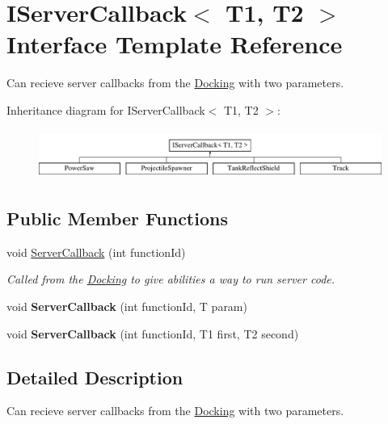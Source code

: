 \hypertarget{interface_i_server_callback}{}\section{I\+Server\+Callback$<$ T1, T2 $>$ Interface Template Reference}
\label{interface_i_server_callback}


Can recieve server callbacks from the \hyperlink{class_docking}{Docking} with two parameters.  


Inheritance diagram for I\+Server\+Callback$<$ T1, T2 $>$\+:\begin{figure}[H]
\begin{center}
\leavevmode
\includegraphics[height=1.627907cm]{interface_i_server_callback}
\end{center}
\end{figure}
\subsection*{Public Member Functions}
\begin{DoxyCompactItemize}
\item 
void \hyperlink{interface_i_server_callback_a2fb5354c07d38473e81ba374bad19446}{Server\+Callback} (int function\+Id)
\begin{DoxyCompactList}\small\item\em Called from the \hyperlink{class_docking}{Docking} to give abilities a way to run server code. \end{DoxyCompactList}\item 
\hypertarget{interface_i_server_callback_a5cc582711ec6f1d97344d3242c8c2a5c}{}\label{interface_i_server_callback_a5cc582711ec6f1d97344d3242c8c2a5c} 
void {\bfseries Server\+Callback} (int function\+Id, T param)
\item 
\hypertarget{interface_i_server_callback_aea86d731a9f2326398b5e3df36ae3c3f}{}\label{interface_i_server_callback_aea86d731a9f2326398b5e3df36ae3c3f} 
void {\bfseries Server\+Callback} (int function\+Id, T1 first, T2 second)
\end{DoxyCompactItemize}


\subsection{Detailed Description}
Can recieve server callbacks from the \hyperlink{class_docking}{Docking} with two parameters. 



